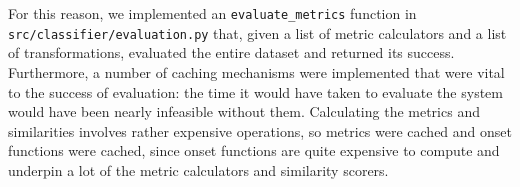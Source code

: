 \documentclass[oneside, class=book, 12pt, crop=false]{standalone}
\begin{document}
For this reason, we implemented an \texttt{evaluate\_metrics} function in \texttt{src/classifier/evaluation.py} that, given a list of metric calculators and a list of transformations, evaluated the entire dataset and returned its success. Furthermore, a number of caching mechanisms were implemented that were vital to the success of evaluation: the time it would have taken to evaluate the system would have been nearly infeasible without them. Calculating the metrics and similarities involves rather expensive operations, so metrics were cached and onset functions were cached, since onset functions are quite expensive to compute and underpin a lot of the metric calculators and similarity scorers.






\ifstandalone
  \printbibliography
\fi
    
\end{document}
